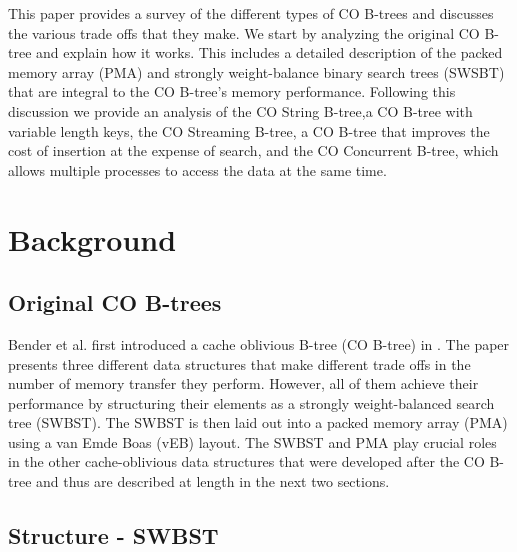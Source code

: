 \documentclass{style}
\begin{document}
This paper provides a survey of the different types of CO B-trees and
discusses the various trade offs that they make. We start by analyzing the
original CO B-tree and explain how it works. This includes a detailed
description of the packed memory array (PMA) and strongly weight-balance
binary search trees (SWSBT) that are integral to the CO B-tree's memory
performance. Following this discussion we provide an analysis of the CO String
B-tree,a CO B-tree with variable length keys, the CO Streaming B-tree, a CO
B-tree that improves the cost of insertion at the expense of search, and the
CO Concurrent B-tree, which allows multiple processes to access the data at
the same time.

\section{Background}

\subsection{Original CO B-trees}
\label{sec:original}

Bender et al. first introduced a cache oblivious B-tree (CO B-tree) in
\cite{cobtree}. The paper presents three different data structures that make
different trade offs in the number of memory transfer they perform. However,
all of them achieve their performance by structuring their elements as a
strongly weight-balanced search tree (SWBST). The SWBST is then laid out into
a packed memory array (PMA) using a van Emde Boas (vEB) layout. The SWBST and
PMA play crucial roles in the other cache-oblivious data structures that were
developed after the CO B-tree and thus are described at length in the next two
sections.

\subsection{Structure - SWBST}
\label{sec:structure}
\end{document}
